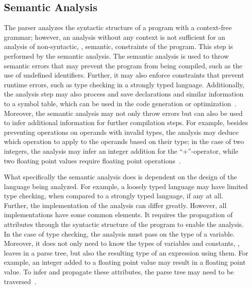 \subsection{Semantic Analysis}
\label{sec:background_semanticalAnalysis}
The parser analyzes the syntactic structure of a program with a context-free grammar; however, an analysis without any context is not sufficient for an analysis of non-syntactic, \ie, semantic, constraints of the program. This step is performed by the semantic analysis. The semantic analysis is used to throw semantic errors that may prevent the program from being compiled, such as the use of undefined identifiers. Further, it may also enforce constraints that prevent runtime errors, such as type checking in a strongly typed language. Additionally, the analysis step may also process and save declarations and similar information to a symbol table, which can be used in the code generation or optimization~\cite{Oliv07, SWW*88}. Moreover, the semantic analysis may not only throw errors but can also be used to infer additional information for further compilation steps. For example, besides preventing operations on operands with invalid types, the analysis may deduce which operation to apply to the operands based on their type; in the case of two integers, the analysis may infer an integer addition for the ``+''-operator, while two floating point values require floating point operations~\cite{Wait74,VSSD07}.

What specifically the semantic analysis does is dependent on the design of the language being analyzed. For example, a loosely typed language may have limited type checking, when compared to a strongly typed language, if any at all. Further, the implementation of the analysis can differ greatly. However, all implementations have some common elements. It requires the propagation of attributes through the syntactic structure of the program to enable the analysis. In the case of type checking, the analysis must pass on the type of a variable. Moreover, it does not only need to know the types of variables and constants, \ie, leaves in a parse tree, but also the resulting type of an expression using them. For example, an integer added to a floating point value may result in a floating point value. To infer and propagate these attributes, the parse tree may need to be traversed~\cite{Wait74,VSSD07}.

